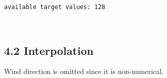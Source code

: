 \documentclass[11pt]{article}
\begin{document}
    \begin{Verbatim}[commandchars=\\\{\}]
available target values: 128

    \end{Verbatim}

    \begin{center}
    \end{center}
    { \hspace*{\fill} \\}
    
    \subsection{4.2 Interpolation}\label{interpolation}

Wind direction is omitted since it is non-numerical.
\end{document}
